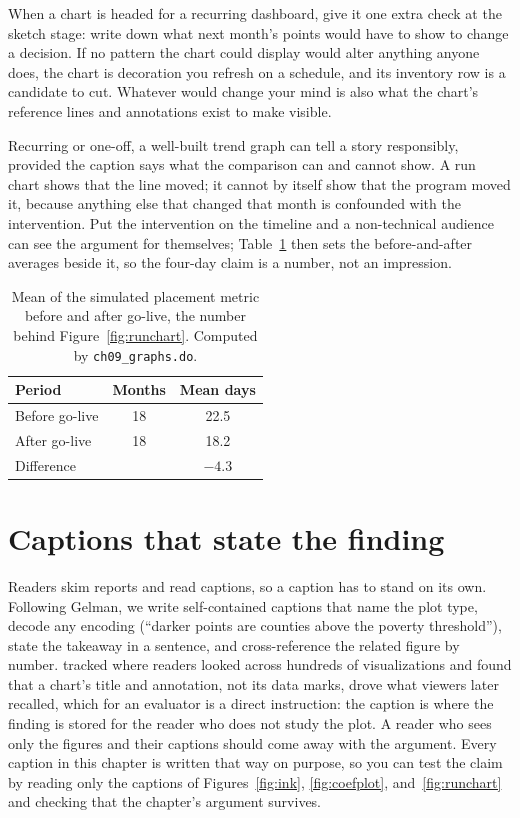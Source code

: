 \documentclass[
    a4paper,
    fontsize=10pt,
    twoside=true,
    numbers=noenddot,
]{kaobook}
\begin{document}
When a chart is headed for a recurring dashboard, give it one extra check at the sketch stage: write down what next month's points would have to show to change a decision. If no pattern the chart could display would alter anything anyone does, the chart is decoration you refresh on a schedule, and its inventory row is a candidate to cut. Whatever would change your mind is also what the chart's reference lines and annotations exist to make visible.

Recurring or one-off, a well-built trend graph can tell a story responsibly, provided the caption says what the comparison can and cannot show. A run chart shows that the line moved; it cannot by itself show that the program moved it, because anything else that changed that month is confounded with the intervention. Put the intervention on the timeline and a non-technical audience can see the argument for themselves; Table~\ref{tab:runsummary} then sets the before-and-after averages beside it, so the four-day claim is a number, not an impression.

\begin{table}[htbp]
\centering
\caption[Before and after the intervention]{Mean of the simulated placement metric before and after go-live, the number behind Figure~\ref{fig:runchart}. Computed by \texttt{ch09\_graphs.do}.}
\label{tab:runsummary}
\begin{tabular}{lcc}
\hline
Period & Months & Mean days \\
\hline
Before go-live & 18 & 22.5 \\
After go-live  & 18 & 18.2 \\
\hline
Difference     &    & $-4.3$ \\
\hline
\end{tabular}
\end{table}

\section{Captions that state the finding}\label{sec:captions}
Readers skim reports and read captions, so a caption has to stand on its own. Following Gelman, we write self-contained captions that name the plot type, decode any encoding (\enquote{darker points are counties above the poverty threshold}), state the takeaway in a sentence, and cross-reference the related figure by number. \textcite{borkin2016beyond} tracked where readers looked across hundreds of visualizations and found that a chart's title and annotation, not its data marks, drove what viewers later recalled, which for an evaluator is a direct instruction: the caption is where the finding is stored for the reader who does not study the plot. A reader who sees only the figures and their captions should come away with the argument. Every caption in this chapter is written that way on purpose, so you can test the claim by reading only the captions of Figures~\ref{fig:ink}, \ref{fig:coefplot}, and~\ref{fig:runchart} and checking that the chapter's argument survives.
\end{document}
